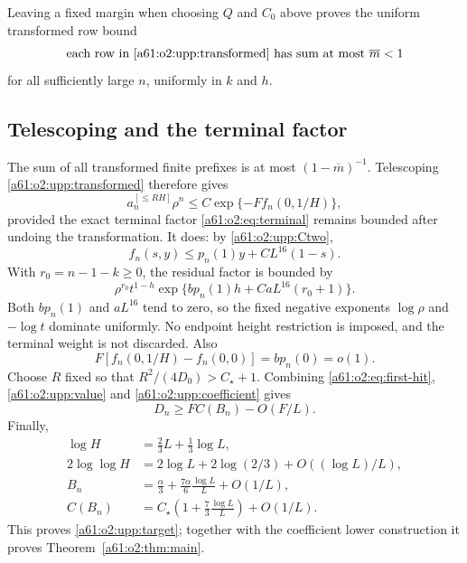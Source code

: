 \documentclass[11pt,letterpaper]{article}
\numberwithin{equation}{section}
\theoremstyle{remark}\newtheorem{remark}[theorem]{Remark}
\newcommand{\st}{\star}
\begin{document}
Leaving a fixed margin when choosing $Q$ and $C_0$ above proves the uniform transformed row bound
\begin{equation}\label{a61:o2:upp:contraction}
 \text{each row in \eqref{a61:o2:upp:transformed} has sum at most }
 \overline m<1
\end{equation}
for all sufficiently large $n$, uniformly in $k$ and $h$.

\subsection{Telescoping and the terminal factor}
The sum of all transformed finite prefixes is at most $(1-\overline m)^{-1}$. Telescoping \eqref{a61:o2:upp:transformed} therefore gives
\begin{equation}\label{a61:o2:upp:coefficient}
 a_n^{[\le RH]}\rho^n\le C\exp\{-Ff_n(0,1/H)\},
\end{equation}
provided the exact terminal factor \eqref{a61:o2:eq:terminal} remains bounded after undoing the transformation. It does: by \eqref{a61:o2:upp:Ctwo},
\[
 f_n(s,y)\le p_n(1)y+CL^{16}(1-s).
\]
With $r_0=n-1-k\ge0$, the residual factor is bounded by
\[
 \rho^{r_0}t^{1-h}
       \exp\{bp_n(1)h+CaL^{16}(r_0+1)\}.
\]
Both $bp_n(1)$ and $aL^{16}$ tend to zero, so the fixed negative exponents $\log\rho$ and $-\log t$ dominate uniformly. No endpoint height restriction is imposed, and the terminal weight is not discarded. Also
\[
 F[f_n(0,1/H)-f_n(0,0)]=bp_n(0)=o(1).
\]
Choose $R$ fixed so that $R^2/(4D_0)>C_\st+1$. Combining \eqref{a61:o2:eq:first-hit}, \eqref{a61:o2:upp:value} and \eqref{a61:o2:upp:coefficient} gives
\[
 D_n\ge FC(B_n)-O(F/L).
\]
Finally,
\begin{align*}
 \log H&=\tfrac23L+\tfrac13\log L,\\
 2\log\log H&=2\log L+2\log(2/3)+O((\log L)/L),\\
 B_n&=\tfrac\alpha3+\tfrac{7\alpha}{6}\frac{\log L}{L}+O(1/L),\\
 C(B_n)&=C_\st\left(1+\tfrac73\frac{\log L}{L}\right)+O(1/L).
\end{align*}
This proves \eqref{a61:o2:upp:target}; together with the coefficient lower construction it proves Theorem~\ref{a61:o2:thm:main}.
\end{document}
